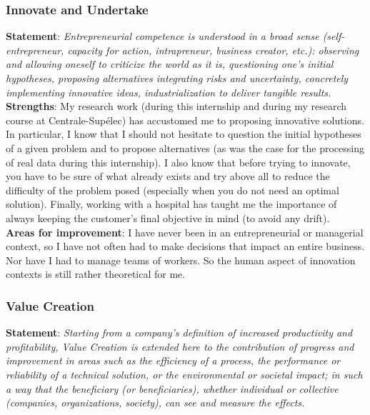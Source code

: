 \documentclass[preprint,12pt]{elsarticle}
\begin{document}
\subsubsection{Innovate and Undertake}

\noindent \textbf{Statement}: \textit{Entrepreneurial competence is understood in a broad sense (self-entrepreneur, capacity for action, intrapreneur, business creator, etc.): observing and allowing oneself to criticize the world as it is, questioning one's initial hypotheses, proposing alternatives integrating risks and uncertainty, concretely implementing innovative ideas, industrialization to deliver tangible results.}\\[3 pt]

\noindent \textbf{Strengths}: My research work (during this internship and during my research course at Centrale-Supélec) has accustomed me to proposing innovative solutions. In particular, I know that I should not hesitate to question the initial hypotheses of a given problem and to propose alternatives (as was the case for the processing of real data during this internship). I also know that before trying to innovate, you have to be sure of what already exists and try above all to reduce the difficulty of the problem posed (especially when you do not need an optimal solution). Finally, working with a hospital has taught me the importance of always keeping the customer's final objective in mind (to avoid any drift).\\[3 pt]

\noindent \textbf{Areas for improvement}: I have never been in an entrepreneurial or managerial context, so I have not often had to make decisions that impact an entire business. Nor have I had to manage teams of workers. So the human aspect of innovation contexts is still rather theoretical for me.

\subsubsection{Value Creation}

\noindent \textbf{Statement}: \textit{Starting from a company's definition of increased productivity and profitability, Value Creation is extended here to the contribution of progress and improvement in areas such as the efficiency of a process, the performance or reliability of a technical solution, or the environmental or societal impact; in such a way that the beneficiary (or beneficiaries), whether individual or collective (companies, organizations, society), can see and measure the effects.}\\[3 pt]
\end{document}
